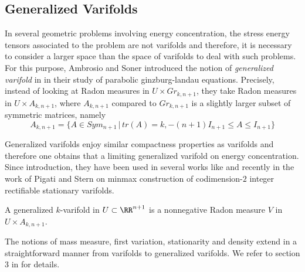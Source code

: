 \subsection{Generalized Varifolds}
In several geometric problems involving energy concentration, the stress energy tensors associated to the problem are not varifolds and therefore, it is necessary to consider a larger space than the space of varifolds to deal with such problems.  For this purpose, Ambrosio and Soner introduced the notion of \textit{generalized varifold} in \cite{as} in their study of parabolic ginzburg-landau equations. Precisely, instead of looking at Radon measures in $U \times Gr_{k,n+1}$, they take Radon measures in $U \times A_{k,n+1}$, where $A_{k,n+1}$ compared to $Gr_{k,n+1}$ is a slightly larger subset of symmetric matrices, namely 
$$A_{k,n+1}= \{A \in Sym_{n+1} \, | \, tr(A)=k, -(n+1) I_{n+1} \leq A \leq I_{n+1}\}$$

Generalized varifolds enjoy similar compactness properties as varifolds and therefore one obtains that a limiting generalized varifold on energy concentration. Since introduction, they have been used in several works like \cite{lw,ms} and recently in the work of Pigati and Stern \cite{ps} on minmax construction of codimension-$2$ integer rectifiable stationary varifolds. 


\begin{defi}
  A generalized $k$-varifold in $U \subset \RR^{n+1}$ is a nonnegative Radon measure $V$ in $U \times A_{k,n+1}$.
\end{defi}

The notions of mass measure, first variation, stationarity and density extend in a straightforward manner from varifolds  to generalized varifolds. We refer to section 3 in \cite{as} for details. 


